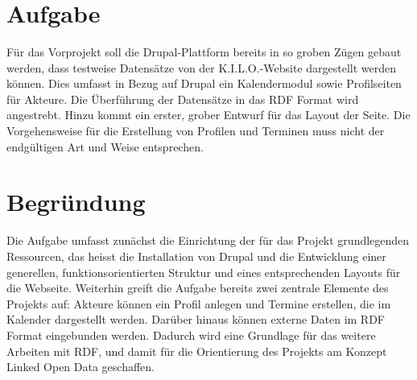 \documentclass{swp}
\begin{document}
\\\\\\\\\\

\section{Aufgabe}
F\"ur das Vorprojekt soll die Drupal-Plattform bereits in so groben Z\"ugen gebaut werden, dass testweise Datens\"atze von der K.I.L.O.-Website dargestellt werden k\"onnen. Dies umfasst in Bezug auf Drupal ein Kalendermodul sowie Profilseiten f\"ur Akteure. Die \"Uberf\"uhrung der Datens\"atze in das RDF Format wird angestrebt. Hinzu kommt ein erster, grober Entwurf f\"ur das Layout der Seite. Die Vorgehensweise f\"ur die Erstellung von Profilen und Terminen muss nicht der endg\"ultigen Art und Weise entsprechen.
\section{Begr\"undung}
Die Aufgabe umfasst zun\"achst die Einrichtung der f\"ur das Projekt grundlegenden Ressourcen, das hei{ss}t die Installation von Drupal und die Entwicklung einer generellen, funktionsorientierten Struktur und eines entsprechenden Layouts f\"ur die Webseite. Weiterhin greift die Aufgabe bereits zwei zentrale Elemente des Projekts auf: Akteure k\"onnen ein Profil anlegen und Termine erstellen, die im Kalender dargestellt werden. Dar\"uber hinaus k\"onnen externe Daten im RDF Format eingebunden werden. Dadurch wird eine Grundlage f\"ur das weitere Arbeiten mit RDF, und damit f\"ur die Orientierung des Projekts am Konzept Linked Open Data geschaffen.\\
\end{document}
